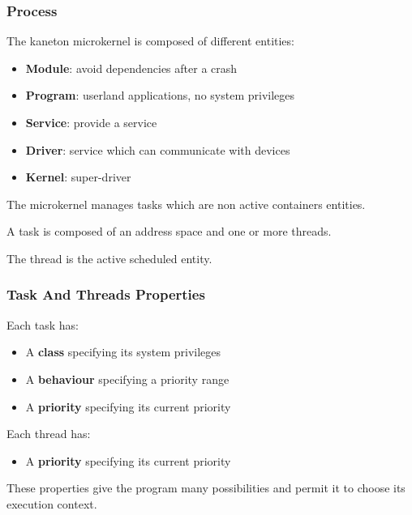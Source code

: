 \begin{frame}
  \frametitle{Process}

  The kaneton microkernel is composed of different entities:

  \begin{itemize}
    \item
      \textbf{Module}: avoid dependencies after a crash
    \item
      \textbf{Program}: userland applications, no system privileges
    \item
      \textbf{Service}: provide a service
    \item
      \textbf{Driver}: service which can communicate with devices
    \item
      \textbf{Kernel}: super-driver
  \end{itemize}

  \nl

  The microkernel manages tasks which are non active containers
  entities.

  \nl

  A task is composed of an address space and one or more threads.

  \nl

  The thread is the active scheduled entity.
\end{frame}


\begin{frame}
  \frametitle{Task And Threads Properties}

  Each task has:

  \begin{itemize}
    \item
      A \textbf{class} specifying its system privileges
    \item
      A \textbf{behaviour} specifying a priority range
    \item
      A \textbf{priority} specifying its current priority
  \end{itemize}

  \nl

  Each thread has:

  \begin{itemize}
    \item
      A \textbf{priority} specifying its current priority
  \end{itemize}

  \nl

  These properties give the program many possibilities and
  permit it to choose its execution context.
\end{frame}


